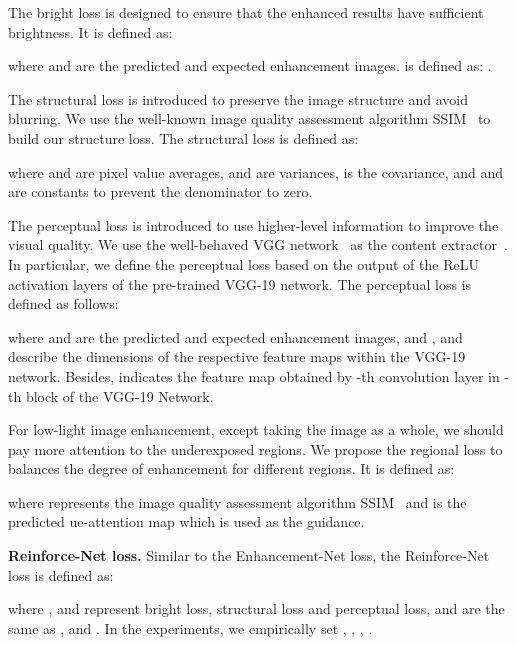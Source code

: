 The bright loss is designed to ensure that the enhanced results have sufficient brightness. It is defined as:
\begin{shrinkeq}{0.5ex}{

}\end{shrinkeq}
where  and  are the predicted and expected enhancement images.  is defined as: .

The structural loss is introduced to preserve the image structure and avoid blurring. We use the well-known image quality assessment algorithm SSIM~\cite{wang2004image} to build our structure loss.
The structural loss is defined as:
\begin{shrinkeq}{0.5ex}{
		
}\end{shrinkeq}
where  and  are pixel value averages,  and  are variances,  is the covariance, and  and  are constants to prevent the denominator to zero.

The perceptual loss is introduced to use higher-level information to improve the visual quality. We use the well-behaved VGG network~\cite{simonyan2014very} as the content extractor~\cite{ledig2016photo}. In particular, we define the perceptual loss based on the output of the ReLU activation layers of the pre-trained VGG-19 network.	The perceptual loss is defined as follows:
\begin{shrinkeq}{0.5ex}{
		
}\end{shrinkeq}
where  and  are the predicted and expected enhancement images, and  ,  and  describe the dimensions of the respective feature maps within the VGG-19 network. Besides,  indicates the feature map obtained by -th convolution layer in -th block of the VGG-19 Network.

For low-light image enhancement, except taking the image as a whole, we should pay more attention to the underexposed regions. We propose the regional loss to balances the degree of enhancement for different regions. It is defined as:

\begin{shrinkeq}{0.5ex}{
		\begin{small}
			
		\end{small}
}\end{shrinkeq}
where  represents the image quality assessment algorithm SSIM~\cite{wang2004image} and  is the predicted ue-attention map which is used as the guidance.

{\bf Reinforce-Net loss.} Similar to the Enhancement-Net loss, the Reinforce-Net loss is defined as:
\begin{shrinkeq}{0.5ex}{
		
}\end{shrinkeq}
where ,  and  represent bright loss, structural loss and perceptual loss, and are the same as ,  and .
In the experiments, we empirically set , , , .

